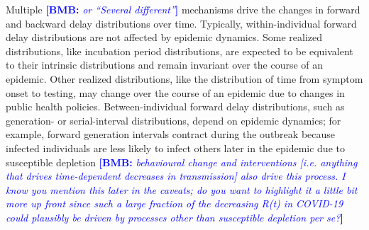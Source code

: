 \documentclass[12pt]{article}
\newcommand{\comment}{\showcomment}
\newcommand{\showcomment}[3]{\textcolor{#1}{\textbf{[#2: }\textsl{#3}\textbf{]}}}
\newcommand{\bmb}[1]{\comment{blue}{BMB}{#1}}
\begin{document}
Multiple \bmb{or ``Several different''} mechanisms drive the changes in forward and backward delay distributions over time.
Typically, within-individual forward delay distributions are not affected by epidemic dynamics.
Some realized distributions, like incubation period distributions, are expected to be equivalent to their intrinsic distributions and remain invariant over the course of an epidemic.
Other realized distributions, like the distribution of time from symptom onset to testing, may change over the course of an epidemic due to changes in public health policies.
Between-individual forward delay distributions, such as generation- or serial-interval distributions, depend on epidemic dynamics;
for example, forward generation intervals contract during the outbreak because infected individuals are less likely to infect others later in  the epidemic due to susceptible depletion \citep{champredon2015intrinsic} \bmb{behavioural change and interventions [i.e. anything that drives time-dependent decreases in transmission] also drive this process.  I know you mention this later in the caveats; do you want to highlight it a little bit more up front since such a large fraction of the decreasing R(t) in COVID-19 could plausibly be driven by processes other than susceptible depletion \emph{per se}?}
\end{document}

